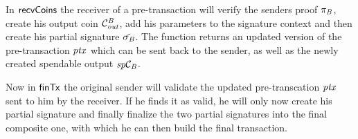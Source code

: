 In $\mathsf{recvCoins}$ the receiver of a pre-transaction will verify the senders proof $\pi_{\mathit{B}}$, create his output coin $\mathcal{C}_{\mathit{out}}^{\mathit{B}}$, add his parameters to the signature context and then create his partial signature $\tilde{\sigma_{\mathit{B}}}$.
The function returns an updated version of the pre-transaction $\mathit{ptx}$ which can be sent back to the sender, as well as the newly created spendable output $\mathit{sp}\mathcal{C}_{\mathit{B}}$.

Now in $\mathsf{finTx}$ the original sender will validate the updated pre-transcation $\mathit{ptx}$ sent to him by the receiver.
If he finds it as valid, he will only now create his partial signature and finally finalize the two partial signatures into the final composite one, with which he can then build the final transaction.

\begin{figure}
    \begin{center}
\end{center}
\end{figure}
